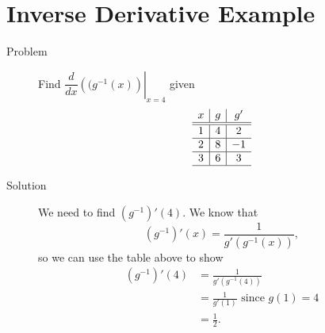 \documentclass[11pt]{article}
\begin{document}
\drawtitle

\section*{Inverse Derivative Example}

\begin{description}
\item[Problem] Find $\left.\dfrac{d}{dx}\left((g^{-1}(x)\right)\right|_{x=4}$ given
  \[
  \begin{array}{c|c|c}
    x & g & g' \\
    \hline
    \hline
    1 & 4 &  2 \\
    \hline
    2 & 8 & -1 \\
    \hline
    3 & 6 &  3 \\
    \hline
  \end{array}
  \]

\item[Solution]
  We need to find $\left(g^{-1}\right)'(4)$.  We know that
    \[
    \left(g^{-1}\right)'(x) = \frac{1}{g'\left(g^{-1}(x)\right)},
    \]
    so we can use the table above to show
    \begin{align*}
      \left(g^{-1}\right)'(4) & = \frac{1}{g'\left(g^{-1}(4)\right)}\\
      & = \frac{1}{g'(1)}\text{ since }g(1)=4\\
      & = \frac{1}{2}.
    \end{align*}


\end{description}
\end{document}
